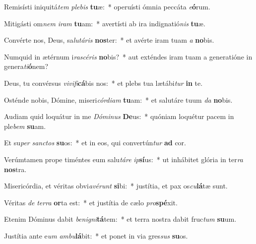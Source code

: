 \item Remisísti iniquitá\textit{tem} \textit{ple}\textit{bis} \textbf{tu}æ:~* operuísti ómnia peccáta \textit{e}\textbf{ó}rum.
\item Mitigásti om\textit{nem} \textit{i}\textit{ram} \textbf{tu}am:~* avertísti ab ira indignatió\textit{nis} \textbf{tu}æ.
\item Convérte nos, Deus, sa\textit{lu}\textit{tá}\textit{ris} \textbf{nos}ter:~* et avérte iram tuam \textit{a} \textbf{no}bis.
\item Numquid in ætérnum i\textit{ra}\textit{scé}\textit{ris} \textbf{no}bis?~* aut exténdes iram tuam a generatióne in genera\textit{ti}\textbf{ó}nem?
\item Deus, tu convérsus \textit{vi}\textit{vi}\textit{fi}\textbf{cá}bis nos:~* et plebs tua lætábi\textit{tur} \textbf{in} te.
\item Osténde nobis, Dómine, miseri\textit{cór}\textit{di}\textit{am} \textbf{tu}am:~* et salutáre tuum \textit{da} \textbf{no}bis.
\item Audiam quid loquátur in me \textit{Dó}\textit{mi}\textit{nus} \textbf{De}us:~* quóniam loquétur pacem in ple\textit{bem} \textbf{su}am.
\item Et su\textit{per} \textit{sanc}\textit{tos} \textbf{su}os:~* et in eos, qui convertún\textit{tur} \textbf{ad} cor.
\item Verúmtamen prope timéntes eum salu\textit{tá}\textit{re} \textit{ip}\textbf{sí}us:~* ut inhábitet glória in ter\textit{ra} \textbf{nos}tra.
\item Misericórdia, et véritas obvi\textit{a}\textit{vé}\textit{runt} \textbf{si}bi:~* justítia, et pax os\textit{cu}\textbf{lá}tæ sunt.
\item Véritas \textit{de} \textit{ter}\textit{ra} \textbf{or}ta est:~* et justítia de cælo \textit{pro}\textbf{spé}xit.
\item Etenim Dóminus dabit \textit{be}\textit{ni}\textit{gni}\textbf{tá}tem:~* et terra nostra dabit fruc\textit{tum} \textbf{su}um.
\item Justítia ante e\textit{um} \textit{am}\textit{bu}\textbf{lá}bit:~* et ponet in via gres\textit{sus} \textbf{su}os.

